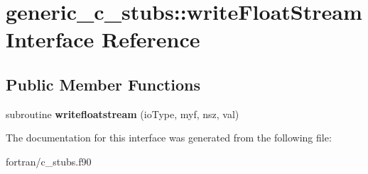 \hypertarget{interfacegeneric__c__stubs_1_1write_float_stream}{}\section{generic\+\_\+c\+\_\+stubs\+:\+:write\+Float\+Stream Interface Reference}
\label{interfacegeneric__c__stubs_1_1write_float_stream}
\subsection*{Public Member Functions}
\begin{DoxyCompactItemize}
\item 
\mbox{\label{interfacegeneric__c__stubs_1_1write_float_stream_a86bb079b8a8abdbb7bf80a458bf09748}} 
subroutine {\bfseries writefloatstream} (io\+Type, myf, nsz, val)
\end{DoxyCompactItemize}


The documentation for this interface was generated from the following file\+:\begin{DoxyCompactItemize}
\item 
fortran/c\+\_\+stubs.\+f90\end{DoxyCompactItemize}
